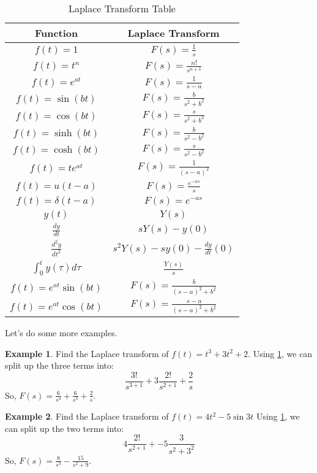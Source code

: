 \documentclass{article}
\theoremstyle{definition}
\newtheorem{example}{Example}[section]
\begin{document}
\begin{table}[h!]
    \centering
    \begin{tabular}{|c|c|}
    \hline
    \textbf{Function} & \textbf{Laplace Transform} \\ \hline
    $f(t) = 1$ & $F(s) = \frac{1}{s}$ \\ \hline
    $f(t) = t^n$ & $F(s) = \frac{n!}{s^{n+1}}$ \\ \hline
    $f(t) = e^{at}$ & $F(s) = \frac{1}{s - a}$ \\ \hline
    $f(t) = \sin(bt)$ & $F(s) = \frac{b}{s^2 + b^2}$ \\ \hline
    $f(t) = \cos(bt)$ & $F(s) = \frac{s}{s^2 + b^2}$ \\ \hline
    $f(t) = \sinh(bt)$ & $F(s) = \frac{b}{s^2 - b^2}$ \\ \hline
    $f(t) = \cosh(bt)$ & $F(s) = \frac{s}{s^2 - b^2}$ \\ \hline
    $f(t) = t e^{at}$ & $F(s) = \frac{1}{(s - a)^2}$ \\ \hline
    $f(t) = u(t - a)$ & $F(s) = \frac{e^{-as}}{s}$ \\ \hline
    $f(t) = \delta(t - a)$ & $F(s) = e^{-as}$ \\ \hline
    $y(t)$ & $Y(s)$ \\ \hline
    $\frac{dy}{dt}$ & $sY(s) - y(0)$ \\ \hline
    $\frac{d^2y}{dt^2}$ & $s^2Y(s) - s y(0) - \frac{dy}{dt}(0)$ \\ \hline
    $\int_0^t y(\tau) d\tau$ & $\frac{Y(s)}{s}$ \\ \hline
    $f(t) = e^{at} \sin(bt)$ & $F(s) = \frac{b}{(s-a)^2 + b^2}$ \\ \hline
    $f(t) = e^{at} \cos(bt)$ & $F(s) = \frac{s - a}{(s-a)^2 + b^2}$ \\ \hline
    \end{tabular}
    \caption{Laplace Transform Table}
    \label{tab:laplace}
    \end{table}
Let's do some more examples.

\begin{example}
    Find the Laplace transform of $f(t)= t^3 + 3t^2 + 2$.
    Using \ref{tab:laplace}, we can split up the three terms into:
    \[\frac{3!}{s^{3+1}} + 3\frac{2!}{s^{2+1}} + \frac{2}{s}\]
    So, $F(s) = \frac{6}{s^4} + \frac{6}{s^3} + \frac{2}{s}$.
\end{example}

\begin{example}
    Find the Laplace transform of $f(t)= 4t^2 - 5 \sin{3t}$
    Using \ref{tab:laplace}, we can split up the two terms into:
    \[4\frac{2!}{s^{2+1}} + -5\frac{3}{s^2+3^2}\]
    So, $F(s) = \frac{8}{s^3} - \frac{15}{s^2+9}$.
\end{example}
\end{document}
